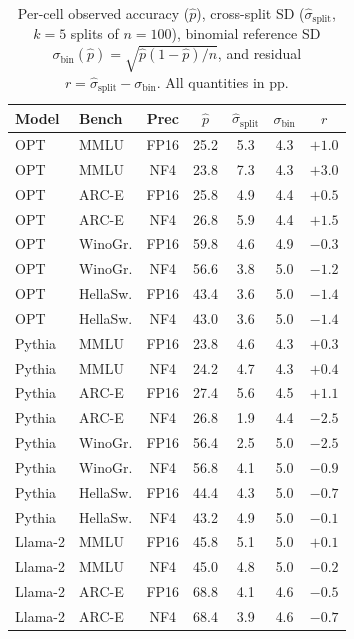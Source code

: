 \documentclass{article}
\begin{document}
\begin{table}[t]
\caption{Per-cell observed accuracy ($\hat p$), cross-split SD ($\hat\sigma_{\text{split}}$, $k{=}5$ splits of $n{=}100$), binomial reference SD $\sigma_{\text{bin}}(\hat p)=\sqrt{\hat p(1-\hat p)/n}$, and residual $r=\hat\sigma_{\text{split}}-\sigma_{\text{bin}}$. All quantities in pp.}
\label{tab:floor}
\centering
\footnotesize
\setlength{\tabcolsep}{4pt}
\begin{tabular}{llccccc}
\toprule
Model & Bench & Prec & $\hat p$ & $\hat\sigma_{\text{split}}$ & $\sigma_{\text{bin}}$ & $r$ \\
\midrule
OPT       & MMLU    & FP16 & 25.2 & 5.3 & 4.3 & $+1.0$ \\
OPT       & MMLU    & NF4  & 23.8 & 7.3 & 4.3 & $+3.0$ \\
OPT       & ARC-E   & FP16 & 25.8 & 4.9 & 4.4 & $+0.5$ \\
OPT       & ARC-E   & NF4  & 26.8 & 5.9 & 4.4 & $+1.5$ \\
OPT       & WinoGr. & FP16 & 59.8 & 4.6 & 4.9 & $-0.3$ \\
OPT       & WinoGr. & NF4  & 56.6 & 3.8 & 5.0 & $-1.2$ \\
OPT       & HellaSw.& FP16 & 43.4 & 3.6 & 5.0 & $-1.4$ \\
OPT       & HellaSw.& NF4  & 43.0 & 3.6 & 5.0 & $-1.4$ \\
\midrule
Pythia    & MMLU    & FP16 & 23.8 & 4.6 & 4.3 & $+0.3$ \\
Pythia    & MMLU    & NF4  & 24.2 & 4.7 & 4.3 & $+0.4$ \\
Pythia    & ARC-E   & FP16 & 27.4 & 5.6 & 4.5 & $+1.1$ \\
Pythia    & ARC-E   & NF4  & 26.8 & 1.9 & 4.4 & $-2.5$ \\
Pythia    & WinoGr. & FP16 & 56.4 & 2.5 & 5.0 & $-2.5$ \\
Pythia    & WinoGr. & NF4  & 56.8 & 4.1 & 5.0 & $-0.9$ \\
Pythia    & HellaSw.& FP16 & 44.4 & 4.3 & 5.0 & $-0.7$ \\
Pythia    & HellaSw.& NF4  & 43.2 & 4.9 & 5.0 & $-0.1$ \\
\midrule
Llama-2   & MMLU    & FP16 & 45.8 & 5.1 & 5.0 & $+0.1$ \\
Llama-2   & MMLU    & NF4  & 45.0 & 4.8 & 5.0 & $-0.2$ \\
Llama-2   & ARC-E   & FP16 & 68.8 & 4.1 & 4.6 & $-0.5$ \\
Llama-2   & ARC-E   & NF4  & 68.4 & 3.9 & 4.6 & $-0.7$ \\

\end{tabular}
\end{table}
\end{document}
